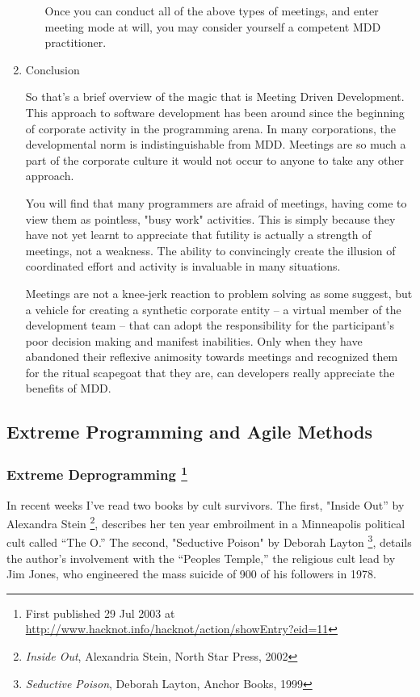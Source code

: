 \documentclass{article}
\begin{document}
\begin{enumerate}
\begin{enumerate}
Once you can conduct all of the above types of meetings, and enter
meeting mode at will, you may consider yourself a competent MDD
practitioner.
\end{enumerate}

\item Conclusion
\label{sec:orgheadline187}

So that's a brief overview of the magic that is Meeting Driven
Development. This approach to software development has been around since
the beginning of corporate activity in the programming arena. In many
corporations, the developmental norm is indistinguishable from MDD.
Meetings are so much a part of the corporate culture it would not occur
to anyone to take any other approach.

You will find that many programmers are afraid of meetings, having come
to view them as pointless, "busy work" activities. This is simply
because they have not yet learnt to appreciate that futility is actually
a strength of meetings, not a weakness. The ability to convincingly
create the illusion of coordinated effort and activity is invaluable in
many situations.

Meetings are not a knee-jerk reaction to problem solving as some
suggest, but a vehicle for creating a synthetic corporate entity -- a
virtual member of the development team -- that can adopt the
responsibility for the participant's poor decision making and manifest
inabilities. Only when they have abandoned their reflexive animosity
towards meetings and recognized them for the ritual scapegoat that they
are, can developers really appreciate the benefits of MDD.
\end{enumerate}

\subsection{Extreme Programming and Agile Methods}
\label{sec:orgheadline223}
\subsubsection{Extreme Deprogramming  \footnote{First published 29 Jul 2003 at
\url{http://www.hacknot.info/hacknot/action/showEntry?eid=11}}}
\label{sec:orgheadline197}

In recent weeks I've read two books by cult survivors. The first,
"Inside Out” by Alexandra Stein \footnote{\emph{Inside Out}, Alexandria Stein, North Star Press, 2002}, describes her ten year embroilment
in a Minneapolis political cult called “The O.” The second, "Seductive
Poison" by Deborah Layton \footnote{\emph{Seductive Poison}, Deborah Layton, Anchor Books, 1999}, details the author's involvement with
the “Peoples Temple,” the religious cult lead by Jim Jones, who
engineered the mass suicide of 900 of his followers in 1978.
\end{document}
